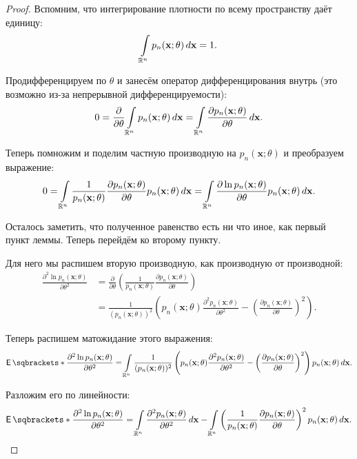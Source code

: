 \begin{proof}
	Вспомним, что интегрирование плотности по всему пространству даёт единицу:
	\[
		\int\limits_{\mathbb{R}^{n}} p_{n}(\mathbf{x}; \theta)\mathop{}\!d \mathbf{x} = 1.
	\]
	
	Продифференцируем по \(\theta\) и занесём оператор дифференцирования внутрь 
	(это возможно из-за непрерывной дифференцируемости):
	\[
		0 = \frac{\partial}{\partial \theta} \int\limits_{\mathbb{R}^{n}} 
		p_{n}(\mathbf{x}; \theta)\mathop{}\!d \mathbf{x} = \int\limits_{\mathbb{R}^{n}} 
		\frac{\partial p_{n}(\mathbf{x}; \theta)}{\partial \theta}\mathop{}\!d 
		\mathbf{x}.
	\]
	
	Теперь помножим и поделим частную производную на \(p_{n}(\mathbf{x}; 
	\theta)\) и преобразуем выражение:
	\[
		0 = \int\limits_{\mathbb{R}^{n}} \frac{1}{p_{n}(\mathbf{x}; 
		\theta)}\frac{\partial p_{n}(\mathbf{x}; \theta)}{\partial \theta} 
		p_{n}(\mathbf{x}; \theta)\mathop{}\!d \mathbf{x} = \int\limits_{\mathbb{R}^{n}} 
		\frac{\partial \ln p_{n}(\mathbf{x}; \theta)}{\partial \theta} 
		p_{n}(\mathbf{x}; \theta)\mathop{}\!d \mathbf{x}.
	\]
	
	Осталось заметить, что полученное равенство есть ни что иное, как первый 
	пункт леммы. Теперь перейдём ко второму пункту.
	
	Для него мы распишем вторую производную, как производную от производной:
	\begin{align*}
		\frac{\partial^{2} \ln p_{n}(\mathbf{x}; \theta)}{\partial \theta^{2}} 
		&= \frac{\partial}{\partial \theta}\left(\frac{1}{p_{n}(\mathbf{x};  
		\theta)}\frac{\partial p_{n}(\mathbf{x}; \theta)}{\partial 
		\theta}\right) \\
		&= \frac{1}{(p_{n}(\mathbf{x}; \theta))^{2}}\left(p_{n}(\mathbf{x}; 
		\theta)\frac{\partial^{2} p_{n}(\mathbf{x}; \theta)}{\partial 
		\theta^{2}} - \left(\frac{\partial p_{n}(\mathbf{x}; \theta)}{\partial 
		\theta}\right)^{2}\right).
	\end{align*}
	
	Теперь распишем матожидание этого выражения:
	\[
		\E{\frac{\partial^{2} \ln p_{n}(\mathbf{x}; \theta)}{\partial 
		\theta^{2}}} = \int\limits_{\R^{n}} \frac{1}{(p_{n}(\mathbf{x}; 
		\theta))^{2}}\left(p_{n}(\mathbf{x}; \theta)\frac{\partial^{2} 
		p_{n}(\mathbf{x}; \theta)}{\partial \theta^{2}} - \left(\frac{\partial 
		p_{n}(\mathbf{x}; \theta)}{\partial \theta}\right)^{2}\right)p_{n} 
		(\mathbf{x}; \theta) \diff \mathbf{x}.
	\]
	
	Разложим его по линейности:
	\[
		\E{\frac{\partial^{2} \ln p_{n}(\mathbf{x}; \theta)}{\partial 
		\theta^{2}}} = \int\limits_{\R^{n}} \frac{\partial^{2} 
		p_{n}(\mathbf{x}; \theta)}{\partial \theta^{2}}\diff \mathbf{x} - 
		\int\limits_{\R^{n}} \left(\frac{1}{p_{n}(\mathbf{x}; 
		\theta)}\frac{\partial p_{n}(\mathbf{x}; \theta)}{\partial 
		\theta}\right)^{2}p_{n} (\mathbf{x}; \theta) \diff \mathbf{x}.
	\]
	

\end{proof}
